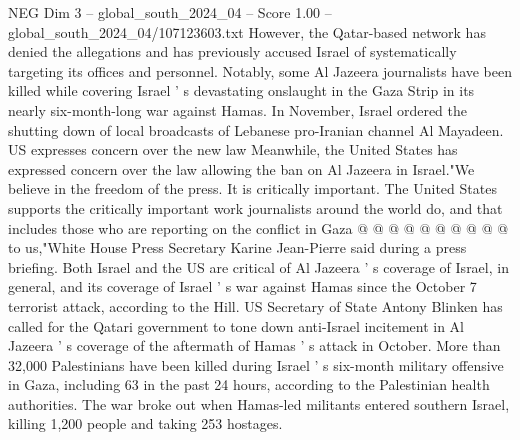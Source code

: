 \begin{textsample}{NEG Dim 3 – global\_south\_2024\_04 – Score 1.00 – global\_south\_2024\_04/107123603.txt}
However, the Qatar-based network has denied the allegations and has previously accused Israel of systematically targeting its offices and personnel.
Notably, some Al Jazeera journalists have been killed while covering Israel ' s devastating onslaught in the Gaza Strip in its nearly six-month-long war against Hamas.
In November, Israel ordered the shutting down of local broadcasts of Lebanese pro-Iranian channel Al Mayadeen.
US expresses concern over the new law Meanwhile, the United States has expressed concern over the law allowing the ban on Al Jazeera in Israel."We believe in the freedom of the press.
It is critically important.
The United States supports the critically important work journalists around the world do, and that includes those who are reporting on the conflict in Gaza @ @ @ @ @ @ @ @ @ @ to us,"White House Press Secretary Karine Jean-Pierre said during a press briefing.
Both Israel and the US are critical of Al Jazeera ' s coverage of Israel, in general, and its coverage of Israel ' s war against Hamas since the October 7 terrorist attack, according to the Hill.
US Secretary of State Antony Blinken has called for the Qatari government to tone down anti-Israel incitement in Al Jazeera ' s coverage of the aftermath of Hamas ' s attack in October.
More than 32,000 Palestinians have been killed during Israel ' s six-month military offensive in Gaza, including 63 in the past 24 hours, according to the Palestinian health authorities.
The war broke out when Hamas-led militants entered southern Israel, killing 1,200 people and taking 253 hostages.

\end{textsample}
